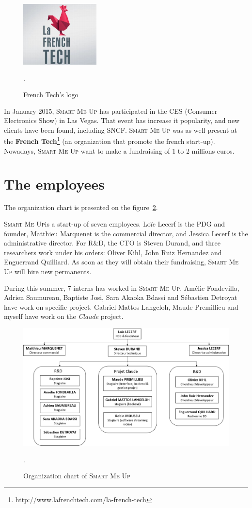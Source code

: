\documentclass[a4paper,11pt]{custom}
\newcommand{\smu}{\textsc{Smart Me Up}}
\newcommand{\claude}{\textit{Claude}\xspace}
\begin{document}
\begin{figure}
  \centering
  \includegraphics[width=4cm]{french-tech.jpg}
  \label{fig:frenchtech}
  \caption{French Tech's logo}.
\end{figure}

In January 2015, \smu{} has participated in the CES (Consumer Electronics Show) in
Las Vegas. That event has increase it popularity, and new clients have been
found, including SNCF. \smu{} was as well present at the \textbf{French
Tech}\footnote{http://www.lafrenchtech.com/la-french-tech}
(an organization that promote the french start-up). Nowadays, \smu{} want to
make a fundraising of 1 to 2 millions euros.

\section{The employees}

The organization chart is presented on the figure~\ref{fig:organigramme}.

\smu is a start-up of seven employees. Loïc Lecerf is the PDG and founder,
Matthieu Marquenet is the commercial director, and Jessica Lecerf is the
administrative director. For R\&D, the CTO is Steven Durand, and three
researchers work under his orders: Oliver Kihl, John Ruiz Hernandez and
Enguerrand Quilliard. As soon as they will obtain their fundraising, \smu{}
will hire new permanents.

During this summer, 7 interns has worked in \smu. Amélie Fondevilla, Adrien
Saumureau, Baptiste Josi, Sara Akaoka Bdassi and Sébastien Detroyat have work on
specific project. Gabriel Mattos Langeloh, Maude Premillieu and myself have work
on the \claude{} project.

\begin{figure}
  \centering
  \def\svgwidth{\columnwidth}
  \includegraphics[width=\textwidth]{organigramme.jpg}
  \label{fig:organigramme}
  \caption{Organization chart of \smu}.
\end{figure}
\end{document}

